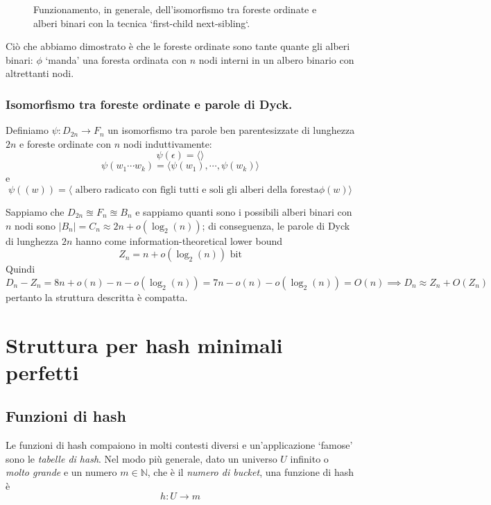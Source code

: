 \begin{figure}[h]
	\caption{Funzionamento, in generale, dell'isomorfismo tra foreste ordinate e alberi binari con
		la tecnica `first-child next-sibling`.}
	\label{fig:iso_forest_bintree}
\end{figure}

Ciò che abbiamo dimostrato è che le foreste ordinate sono tante quante gli alberi binari:
$\phi$ `manda' una foresta ordinata con $n$ nodi interni in un albero binario con altrettanti nodi.

\subsubsection{Isomorfismo tra foreste ordinate e parole di Dyck.}
Definiamo $\psi: D_{2n} \rightarrow F_n$ un isomorfismo tra parole ben parentesizzate di lunghezza $2n$ e
foreste ordinate con $n$ nodi induttivamente:
$$
	\psi(\epsilon) = \langle \rangle
$$
$$
	\psi(w_1 \cdots w_k) =  \langle\psi(w_1), \cdots, \psi(w_k)\rangle
$$
e
$$
	\psi((w)) = \langle \text{ albero radicato con figli tutti e soli gli alberi della foresta} \phi(w)  \rangle
$$

\noindent
Sappiamo che $D_{2n} \approxeq F_n \approxeq B_n$ e sappiamo quanti sono i possibili alberi binari
con $n$ nodi sono $|B_n| = C_n  \approx 2n + o (\log_2(n))$; di conseguenza,
le parole di Dyck di lunghezza $2n$ hanno come information-theoretical lower bound
$$
	Z_n = n + o(\log_2(n)) \text{ bit}
$$
Quindi
$$
	D_n - Z_n =  8n + o(n) - n - o(\log_2(n)) = 7n - o(n) - o(\log_2(n))  = O(n) \implies D_n \approx Z_n + O(Z_n)
$$
pertanto la struttura descritta è compatta.

\section{Struttura per hash minimali perfetti}
\subsection{Funzioni di hash}
Le funzioni di hash compaiono in molti contesti diversi e un'applicazione
`famose' sono le \textit{tabelle di hash}.
Nel modo più generale, dato un universo $U$ infinito o \textit{molto grande} e un numero $m \in \mathbb{N}$,
che è il \textit{numero di bucket}, una funzione di hash è
$$
	h: U \rightarrow m
$$

